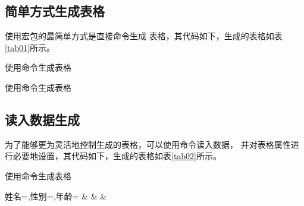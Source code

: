 \documentclass[scheme=chinese, heading = true, UTF8]{ctexart}
\begin{document}
  \subsection{简单方式生成表格}
  使用宏包的最简单方式是直接命令生成
  表格，其代码如下，生成的表格如表\ref{tab01}所示。
  \begin{center}
    \begin{minipage}[h]{0.7\linewidth}
      \begin{codeonly}
          \begin{table}[htb]
            \centering
            \caption{使用命令生成表格\label{tab01}}
          \end{table}
      \end{codeonly}
    \end{minipage}
  \end{center}
  
  \begin{table}[htb]
    \centering
    \caption{使用命令生成表格\label{tab01}}
  \end{table}
  
  \subsection{读入数据生成}
  为了能够更为灵活地控制生成的表格，可以使用命令读入数据，
  并对表格属性进行必要地设置，其代码如下，生成的表格如表\ref{tab02}所示。
  \begin{center}
    \begin{minipage}[h]{0.75\linewidth}
      \begin{codeonly}
          \begin{table}[htb]
            \centering
            \caption{使用命令生成表格\label{tab02}}
                    {姓名=\name,性别=\gender,年龄=\age}%
                    {\thecsvrow & \name & \gender & \age}%
          \end{table}     
      \end{codeonly}      
    \end{minipage}
  \end{center}
  
\end{document}
